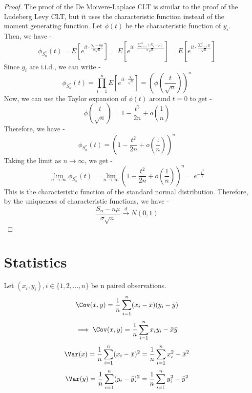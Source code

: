 \documentclass[openany]{book}
\begin{document}
\begin{proof}
    The proof of the De Moivere-Laplace CLT is similar to the proof of the Ludeberg Levy CLT, but it uses the characteristic function instead of the moment generating function. Let $\phi(t)$ be the characteristic function of $y_i$. Then, we have -
    $$\phi_{S_n^*}(t) = E[e^{it \cdot \frac{S_n - n\mu}{\sigma\sqrt{n}}}] = E[e^{it \cdot \frac{\sum_{i=1}^{n} (X_i - \mu)}{\sigma\sqrt{n}}}] = E[e^{it \cdot \frac{\sum_{i=1}^{n} y_i}{\sqrt{n}}}]$$
    Since $y_i$ are i.i.d., we can write -
    $$\phi_{S_n^*}(t) = \prod_{i=1}^{n} E[e^{it \cdot \frac{y_i}{\sqrt{n}}}] = \left( \phi\left( \frac{t}{\sqrt{n}} \right) \right)^n$$
    Now, we can use the Taylor expansion of $\phi(t)$ around $t=0$ to get -
    $$\phi\left( \frac{t}{\sqrt{n}} \right) = 1 - \frac{t^2}{2n} + o\left( \frac{1}{n} \right)$$
    Therefore, we have -
    $$\phi_{S_n^*}(t) = \left( 1 - \frac{t^2}{2n} + o\left( \frac{1}{n} \right) \right)^n$$
    Taking the limit as $n \to \infty$, we get -
    $$\lim_{n \to \infty} \phi_{S_n^*}(t) = \lim_{n \to \infty} \left( 1 - \frac{t^2}{2n} + o\left( \frac{1}{n} \right) \right)^n = e^{-\frac{t^2}{2}}$$
    This is the characteristic function of the standard normal distribution. Therefore, by the uniqueness of characteristic functions, we have -
    $$\frac{S_n - n\mu}{\sigma\sqrt{n}} \xrightarrow{d} N(0, 1)$$
\end{proof}
\part{Statistics}
Let $(x_i, y_i), i\in \{1, 2, \ldots, n\}$ be n paired observations.
$$\Cov(x, y) = \frac{1}{n} \sum_{i=1}^{n} (x_i - \bar{x})(y_i - \bar{y})$$
$$\implies \Cov(x, y) = \frac{1}{n} \sum_{i=1}^{n} x_i y_i - \bar{x} \bar{y}$$
$$\Var(x) = \frac{1}{n} \sum_{i=1}^{n} (x_i - \bar{x})^2 = \frac{1}{n} \sum_{i=1}^{n} x_i^2 - \bar{x}^2$$
$$\Var(y) = \frac{1}{n} \sum_{i=1}^{n} (y_i - \bar{y})^2 = \frac{1}{n} \sum_{i=1}^{n} y_i^2 - \bar{y}^2$$
\end{document}
